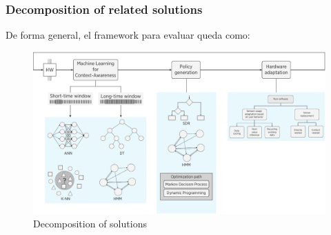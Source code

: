 \documentclass[compress,9pt,xcolor={dvipsnames,table}]{beamer}
\begin{document}
\begin{frame}[t]\frametitle{Decomposition of related solutions}
De forma general, el framework para evaluar queda como:
\begin{figure}[tb]
  \centering
  \includegraphics[width=\textwidth]{../../../resources/images/vectors/dual-taxonomy}
  \caption{Decomposition of solutions}
  \label{fig:dual-taxonomy}
  \end{figure}
\end{frame}
\end{document}
